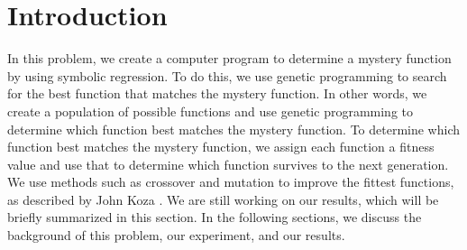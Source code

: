 

\section{Introduction}
\label{sec:intro}



In this problem, we create a computer program to determine a mystery
function by using symbolic regression. To do this, we use genetic programming
to search for the best function that matches the mystery function.
In other words, we create a population of possible functions and use genetic programming to determine which function 
best matches the mystery function. To determine which function best matches the
mystery function, we assign each function a fitness value and use that to 
determine which function survives to the next generation. We use methods such
as crossover and mutation to improve the fittest functions, as described by John Koza \cite{genetic programming}. We are still working on our results, which will be briefly summarized in this section. In the following sections, we discuss the background of this problem, our experiment, and our results. 



